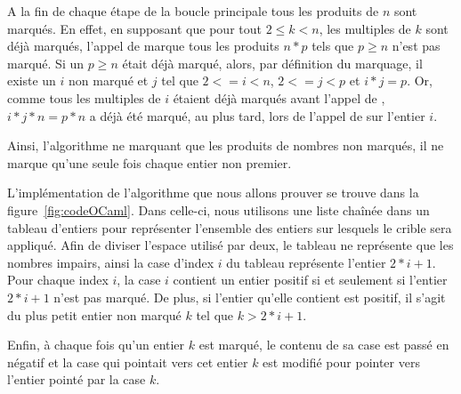 \documentclass[a4paper]{easychair}
\begin{document}
A la fin de chaque étape de la boucle principale tous les produits de $n$ sont
marqués. En effet, en supposant que pour tout $2 \leq k < n$, les multiples de $k$
sont déjà marqués, l'appel de  marque tous les produits
$n * p$ tels que $p \geq n$ n'est pas marqué. Si un $p \geq n$ était déjà marqué,
alors, par définition du marquage, il existe un $i$ non marqué et $j$ tel que
$2 <= i < n$, $2 <= j < p$ et $i * j = p$. Or, comme tous les multiples de $i$
étaient déjà marqués avant l'appel de , $i * j * n = p * n$
a déjà été marqué, au plus tard, lors de l'appel de  sur
l'entier $i$.

Ainsi, l'algorithme ne marquant que les produits de nombres non marqués, il ne
marque qu'une seule fois chaque entier non premier.

L'implémentation de l'algorithme que nous allons prouver se trouve dans la
figure~\ref{fig:codeOCaml}. Dans celle-ci, nous utilisons une liste chaînée
dans un tableau d'entiers pour représenter l'ensemble des entiers sur lesquels
le crible sera appliqué.
Afin de diviser l'espace utilisé par deux, le tableau ne représente que les nombres
impairs, ainsi la case d'index $i$ du tableau représente l'entier $2 * i + 1$.
Pour chaque index $i$, la case $i$ contient un entier positif si et
seulement si l'entier $2 * i + 1$ n'est pas marqué.
De plus, si l'entier qu'elle contient est positif, il s'agit du plus
petit entier non marqué $k$ tel que $k > 2 * i + 1$.

Enfin, à chaque fois qu'un entier $k$ est marqué, le contenu de sa case est passé
en négatif et la case qui pointait vers cet entier $k$ est modifié pour pointer
vers l'entier pointé par la case $k$.
\end{document}
